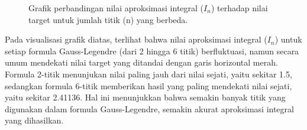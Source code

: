 \documentclass[conference]{IEEEtran}
\begin{document}
\begin{figure}[htbp]
\centering
{}
\caption{Grafik perbandingan nilai aproksimasi integral ($I_n$) terhadap nilai target untuk jumlah titik (n) yang berbeda.}
\label{fig:grafik_aproksimasi_integral}
\end{figure}

Pada visualisasi grafik diatas, terlihat bahwa nilai aproksimasi integral ($I_n$) untuk setiap formula Gauss-Legendre (dari 2 hingga 6 titik) berfluktuasi, namun secara umum mendekati nilai target yang ditandai dengan garis horizontal merah. Formula 2-titik menunjukan nilai paling jauh dari nilai sejati, yaitu sekitar 1.5, sedangkan formula 6-titik memberikan hasil yang paling mendekati nilai sejati, yaitu sekitar 2.41136. Hal ini menunjukkan bahwa semakin banyak titik yang digunakan dalam formula Gauss-Legendre, semakin akurat aproksimasi integral yang dihasilkan.
\end{document}
